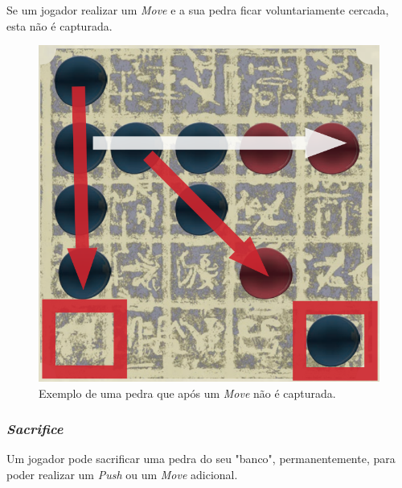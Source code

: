\documentclass[a4paper]{article}
\begin{document}
\newpage

Se um jogador realizar um \textit{Move} e a sua pedra ficar voluntariamente cercada, esta não é capturada.

\begin{figure}[!htb]
	\centering
	\includegraphics[scale=0.3]{push2.png} 
	\caption{Exemplo de uma pedra que após um \textit{Move} não é capturada.}
\end{figure}

\subsubsection{\textit{Sacrifice}}

Um jogador pode sacrificar uma pedra do seu "banco", permanentemente, para poder realizar um \textit{Push} ou um \textit{Move} adicional.
\end{document}
